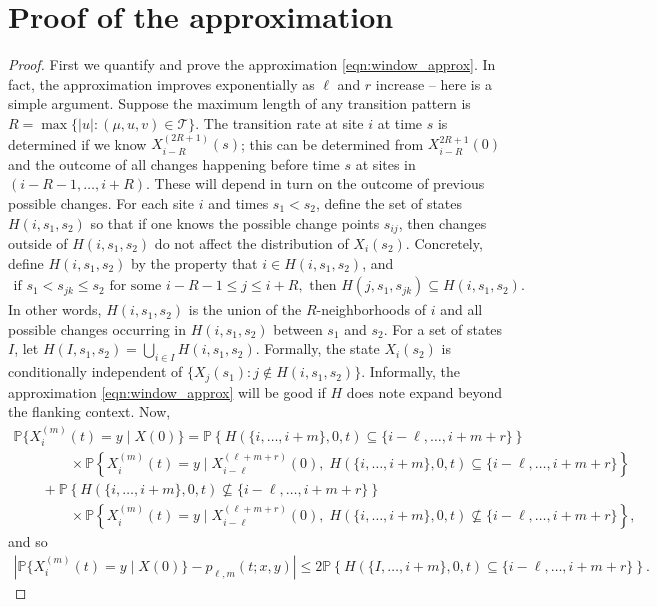 \documentclass{article}
\renewcommand{\P}{\mathbb{P}}
\newcommand{\calT}{\mathcal{T}}  %
\newcommand{\st}{\colon}  %
\theoremstyle{plain}
\theoremstyle{definition}
\begin{document}
\section{Proof of the approximation}
\label{ss:approx_pf}

\begin{proof}

First we quantify and prove the approximation \eqref{eqn:window_approx}.
In fact, the approximation improves exponentially as $\ell$ and $r$ increase --
here is a simple argument.
Suppose the maximum length of any transition pattern is $R = \max\{ |u| : (\mu,u,v) \in \calT \}$.
The transition rate at site $i$ at time $s$ is determined if we know $X_{i-R}^{(2R+1)}(s)$;
this can be determined from $X_{i-R}^{2R+1}(0)$ and the outcome of all changes happening before time $s$ at sites in $(i-R-1, \ldots, i+R)$.
These will depend in turn on the outcome of previous possible changes.
For each site $i$ and times $s_1 < s_2$, define the set of states $H(i,s_1,s_2)$
so that if one knows the possible change points $s_{ij}$,
then changes outside of $H(i,s_1,s_2)$ do not affect the distribution of $X_i(s_2)$.
Concretely, define $H(i,s_1,s_2)$ by the property that $i \in H(i,s_1,s_2)$, and
\begin{gather}
  \text{if } s_1 < s_{jk} \le s_2 \text{ for some } i-R-1 \le j \le i+R, \text{ then } H(j,s_1,s_{jk}) \subseteq H(i,s_1,s_2) .
\end{gather}
In other words, $H(i,s_1,s_2)$ is the union of the $R$-neighborhoods of $i$ and all possible changes occurring in $H(i,s_1,s_2)$ between $s_1$ and $s_2$.
For a set of states $I$, let $H(I,s_1,s_2) = \bigcup_{i\in I} H(i,s_1,s_2)$.
Formally, the state $X_i(s_2)$ is conditionally independent of $\{X_j(s_1) \st j \notin H(i,s_1,s_2)\}$.
Informally, the approximation \eqref{eqn:window_approx} will be good if $H$ does note expand beyond the flanking context.
Now,
\begin{multline}
  \P\{ X_i^{(m)}(t) = y \mid X(0) \}
  = \P\left\{ H(\{i,\ldots,i+m\},0,t)\subseteq\{i-\ell,\ldots,i+m+r\} \right\} \\
   \qquad \qquad {} \times \P\left\{ X_i^{(m)}(t) = y \mid X_{i-\ell}^{(\ell+m+r)}(0), \; H(\{i,\ldots,i+m\},0,t)\subseteq\{i-\ell,\ldots,i+m+r\} \right\} \\
     \qquad {} + \P\left\{ H(\{i,\ldots,i+m\},0,t)\nsubseteq\{i-\ell,\ldots,i+m+r\} \right\}  \\
   \qquad\qquad {} \times \P\left\{ X_i^{(m)}(t) = y \mid X_{i-\ell}^{(\ell+m+r)}(0), \; H(\{i,\ldots,i+m\},0,t)\nsubseteq\{i-\ell,\ldots,i+m+r\} \right\} ,
\end{multline}
and so
\begin{align} \label{eqn:prob_approx}
  \left| \P\{ X_i^{(m)}(t) = y \mid X(0) \} - p_{\ell,m}(t;x,y) \right| \le 2 \P\left\{  H(\{I,\ldots,i+m\},0,t)\subseteq\{i-\ell,\ldots,i+m+r\} \right\}.
\end{align}


\end{proof}
\end{document}
